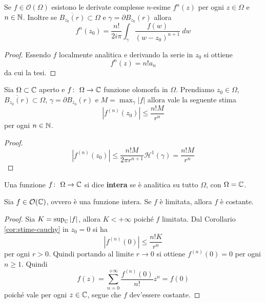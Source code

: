 \begin{corollary}
  Se $f \in \mathcal{O}(\Omega)$ esistono le derivate complesse $n$-esime
  $f^{n}(z)$ per ogni $z \in \Omega$ e $n \in \mathbb{N}$. Inoltre se
  $\overline{B_{z_0}(r)} \subset \Omega$ e $\gamma = \partial B_{z_0}(r)$
  allora
  \begin{equation*}
    f^n(z_0) = \frac{n!}{2i\pi} \int_\gamma \frac{f(w)}{(w-z_0)^{n+1}}\ dw
  \end{equation*}
\end{corollary}
\begin{proof}
  Essendo $f$ localmente analitica e derivando la serie in $z_0$ si ottiene 
  \begin{equation*}
    f^n(z) = n!a_n 
  \end{equation*}
  da cui la tesi.
\end{proof}

\begin{corollary}
  Sia $\Omega \subset \mathbb{C}$ aperto e $f \colon\ \Omega \rightarrow \mathbb{C}$ funzione
  olomorfa in $\Omega$. Prendiamo $z_0 \in \Omega$, $\overline{B_{z_0}(r)}
  \subset \Omega$, $\gamma = \partial B_{z_0}(r)$ e $M = \max_{\gamma} |f|$
  allora vale la seguente stima
  \begin{equation*}
    |f^{(n)}(z_0)| \le \frac{n!M}{r^n}
  \end{equation*}
  per ogni $n \in \mathbb{N}$.
  \label{cor:stime-cauchy}
\end{corollary}
\begin{proof}
  \begin{equation*}
    |f^{(n)}(z_0)| \le \frac{n! M}{2\pi r^{n+1}} \mathcal{H}^1(\gamma)
    =\frac{n!M}{r^n}
  \end{equation*}
\end{proof}

\begin{definition}
  Una funzione $f \colon\ \Omega \rightarrow \mathbb{C}$ si dice \textbf{intera} se è analitica su
  tutto $\Omega$, con $\Omega = \mathbb{C}$. 
\end{definition}

\begin{theorem}[Liouville]
  Sia $f \in \mathcal{O}(\mathbb{C})$, ovvero è una funzione intera. Se $f$ è limitata, allora
  $f$ è costante.
  \label{thr:liouville}
\end{theorem}
\begin{proof}
  Sia $K = \sup_{\mathbb{C}} |f|$, allora $K < +\infty$ poiché $f$ limitata. Dal 
  Corollario \ref{cor:stime-cauchy} in $z_0 = 0$ si ha 
  \begin{equation*}
    |f^{(n)}(0)| \le \frac{n! K}{r^n}
  \end{equation*}
  per ogni $r > 0$. Quindi portando al limite $r \to 0$ si ottiene
  $f^{\left(n \right)}(0) = 0$ per ogni $n \ge 1$. Quindi
  \begin{equation*}
    f(z) = \sum^{+\infty}_{n=0} \frac{f^{(n)}(0)}{n!} z^n = f(0)
  \end{equation*}
  poiché vale per ogni $z\in \mathbb{C}$, segue che $f$ dev'essere costante.
\end{proof}

